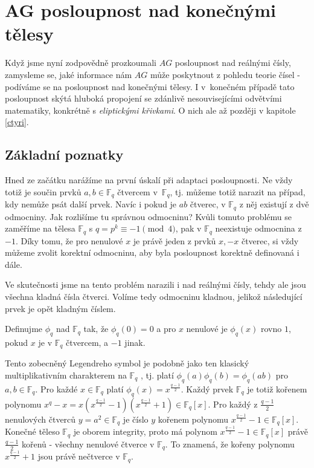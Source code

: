 \documentclass[12pt]{report}
\begin{document}
\chapter{AG posloupnost nad konečnými tělesy}

Když jsme nyní zodpovědně prozkoumali $AG$ posloupnost nad reálnými čísly, zamysleme se, jaké informace nám $AG$ může poskytnout z pohledu teorie čísel - podíváme se na posloupnost nad konečnými tělesy. I v~konečném případě tato posloupnost skýtá hluboká propojení se zdánlivě nesouvisejícími odvětvími matematiky, konkrétně s \textit{eliptickými křivkami}. O nich ale až později v kapitole \ref{ctyri}.


\section{Základní poznatky}

Hned ze začátku narážíme na první úskalí při adaptaci posloupnosti. Ne vždy totiž je součin prvků $a,b \in \mathbb{F}_q$ čtvercem v~$\mathbb{F}_q$, tj. můžeme totiž narazit na případ, kdy nemůže psát další prvek. Navíc i pokud je $ab$ čtverec, v $\mathbb{F}_q$ z něj existují z dvě odmocniny. Jak rozlišíme tu správnou odmocninu? Kvůli tomuto problému se zaměříme na tělesa $\mathbb{F}_q$ s $q = p^k \equiv -1 \pmod{4}$, pak v $\mathbb{F}_q$ neexistuje odmocnina z $-1$. Díky tomu, že pro nenulové $x$ je právě jeden z prvků $x, -x$ čtverec, si vždy můžeme zvolit korektní odmocninu, aby byla posloupnost korektně definovaná i dále.  

\begin{poznamka}
Ve skutečnosti jsme na tento problém narazili i nad reálnými čísly, tehdy ale jsou všechna kladná čísla čtverci. Volíme tedy odmocninu kladnou, jelikož následující prvek je opět kladným číslem.
\end{poznamka}

\begin{definice}
Definujme  $\phi_q$ nad $\mathbb{F}_q$ tak, že $\phi_q(0) = 0$ a pro $x$ nenulové je $\phi_q(x)$ rovno $1$, pokud $x$ je v $\mathbb{F}_q$ čtvercem,  a $-1$ jinak.
\end{definice}

Tento zobecněný Legendreho symbol je podobně jako ten klasický multiplikativním charakterem na $\mathbb{F}_q$ \cite[Ch. 8.]{Ireland}, tj. platí $\phi_q(a)\phi_q(b)=\phi_q(ab)$ pro $a,b \in \mathbb{F}_q$. Pro každé $x \in \mathbb{F}_q$ platí $\phi_q(x) = x^{\frac{q-1}{2}}$. Každý prvek $\mathbb{F}_q$ je totiž kořenem polynomu $x^{q} - x = x \left(x^{\frac{q-1}{2}} - 1\right) \left( x^{\frac{q-1}{2}}+1 \right) \in \mathbb{F}_q [x]$. Pro každý z $\frac{q-1}{2}$ nenulových čtverců $y = a^2 \in \mathbb{F}_q$ je číslo $y$ kořenem polynomu $x^{\frac{q-1}{2}} - 1 \in \mathbb{F}_q [x]$. Konečné těleso $\mathbb{F}_q$ je oborem integrity, proto má polynom $x^{\frac{q-1}{2}} - 1 \in \mathbb{F}_q [x]$ právě $\frac{q-1}{2}$ kořenů - všechny nenulové čtverce v $\mathbb{F}_q$. To znamená, že kořeny polynomu $x^{\frac{q-1}{2}}+1$ jsou právě nečtverce v $\mathbb{F}_q$.
\end{document}

